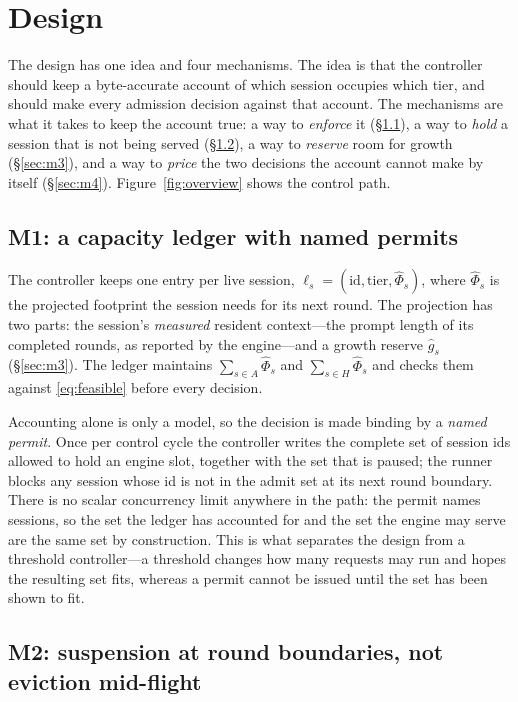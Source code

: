 \section{Design}
\label{sec:design}

The design has one idea and four mechanisms. The idea is that the controller should keep
a byte-accurate account of which session occupies which tier, and should make every
admission decision against that account. The mechanisms are what it takes to keep the
account true: a way to \emph{enforce} it (\S\ref{sec:m1}), a way to \emph{hold} a session
that is not being served (\S\ref{sec:m2}), a way to \emph{reserve} room for growth
(\S\ref{sec:m3}), and a way to \emph{price} the two decisions the account cannot make by
itself (\S\ref{sec:m4}). Figure~\ref{fig:overview} shows the control path.

\subsection{M1: a capacity ledger with named permits}
\label{sec:m1}

The controller keeps one entry per live session,
$\ell_s=(\text{id},\text{tier},\hat\Phi_s)$, where $\hat\Phi_s$ is the projected footprint
the session needs for its next round. The projection has two parts: the session's
\emph{measured} resident context---the prompt length of its completed rounds, as reported
by the engine---and a growth reserve $\hat g_s$ (\S\ref{sec:m3}). The ledger maintains
$\sum_{s\in A}\hat\Phi_s$ and $\sum_{s\in H}\hat\Phi_s$ and checks them against
\eqref{eq:feasible} before every decision.

Accounting alone is only a model, so the decision is made binding by a \emph{named
permit}. Once per control cycle the controller writes the complete set of session ids
allowed to hold an engine slot, together with the set that is paused; the runner blocks
any session whose id is not in the admit set at its next round boundary. There is no
scalar concurrency limit anywhere in the path: the permit names sessions, so the set the
ledger has accounted for and the set the engine may serve are the same set by
construction. This is what separates the design from a threshold controller---a threshold
changes how many requests may run and hopes the resulting set fits, whereas a permit
cannot be issued until the set has been shown to fit.

\subsection{M2: suspension at round boundaries, not eviction mid-flight}
\label{sec:m2}

